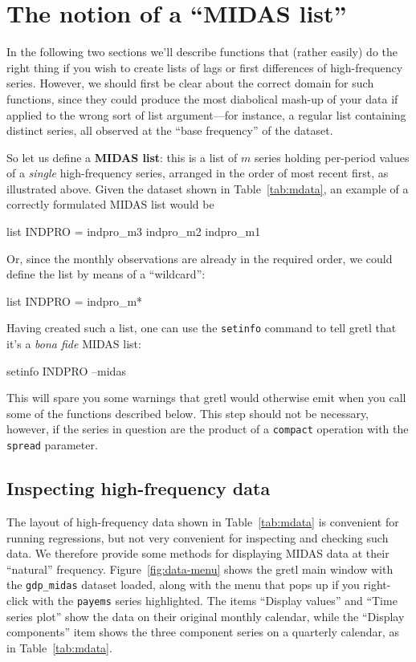 \section{The notion of a ``MIDAS list''}
\label{sec:midas-list}

In the following two sections we'll describe functions that (rather
easily) do the right thing if you wish to create lists of lags or
first differences of high-frequency series. However, we should first
be clear about the correct domain for such functions, since they could
produce the most diabolical mash-up of your data if applied to the
wrong sort of list argument---for instance, a regular list containing
distinct series, all observed at the ``base frequency'' of the
dataset.

So let us define a \textbf{MIDAS list}: this is a list of $m$ series
holding per-period values of a \textit{single} high-frequency series,
arranged in the order of most recent first, as illustrated
above. Given the dataset shown in Table~\ref{tab:mdata}, an example
of a correctly formulated MIDAS list would be
%
\begin{code}
list INDPRO = indpro_m3 indpro_m2 indpro_m1
\end{code}
%
Or, since the monthly observations are already in the required order,
we could define the list by means of a ``wildcard'':
%
\begin{code}
list INDPRO = indpro_m*
\end{code}

Having created such a list, one can use the \texttt{setinfo} command
to tell gretl that it's a \textit{bona fide} MIDAS list:
%
\begin{code}
setinfo INDPRO --midas
\end{code}
%
This will spare you some warnings that gretl would otherwise emit when
you call some of the functions described below. This step should not
be necessary, however, if the series in question are the product of a
\texttt{compact} operation with the \texttt{spread} parameter.

\subsection{Inspecting high-frequency data}

The layout of high-frequency data shown in Table~\ref{tab:mdata} is
convenient for running regressions, but not very convenient for
inspecting and checking such data. We therefore provide some methods
for displaying MIDAS data at their ``natural''
frequency. Figure~\ref{fig:data-menu} shows the gretl main window with
the \texttt{gdp\_midas} dataset loaded, along with the menu that pops
up if you right-click with the \texttt{payems} series highlighted.
The items ``Display values'' and ``Time series plot'' show the data
on their original monthly calendar, while the ``Display components''
item shows the three component series on a quarterly calendar, as
in Table~\ref{tab:mdata}.

